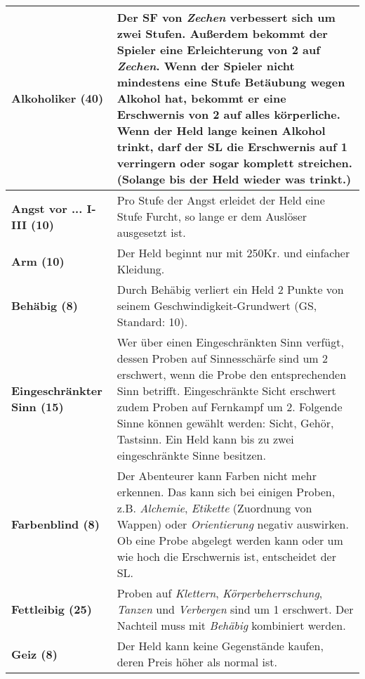 \begin{longtable}{|p{5cm}|p{11cm}|}
\hline

\textbf{Alkoholiker (40)} & Der SF von \textit{Zechen} verbessert sich um zwei Stufen. Außerdem bekommt der Spieler eine Erleichterung von 2 auf \textit{Zechen}. Wenn der Spieler nicht mindestens eine Stufe Betäubung wegen Alkohol hat, bekommt er eine Erschwernis von 2 auf alles körperliche. Wenn der Held lange keinen Alkohol trinkt, darf der SL die Erschwernis auf 1 verringern oder sogar komplett streichen. (Solange bis der Held wieder was trinkt.) \\ \hline

\textbf{Angst vor ... I-III (10)} & Pro Stufe der Angst erleidet der Held eine Stufe Furcht, so lange er dem Auslöser ausgesetzt ist. \\ \hline

\textbf{Arm (10)} & Der Held beginnt nur mit 250Kr. und einfacher Kleidung. \\ \hline

\textbf{Behäbig (8)} & Durch Behäbig verliert ein Held 2 Punkte von seinem Geschwindigkeit-Grundwert (GS, Standard: 10). \\ \hline

\textbf{Eingeschränkter Sinn (15)} & Wer über einen Eingeschränkten Sinn verfügt, dessen Proben auf Sinnesschärfe sind um 2 erschwert, wenn die Probe den entsprechenden Sinn betrifft. Eingeschränkte Sicht erschwert zudem Proben auf Fernkampf um 2. Folgende Sinne können gewählt werden: Sicht, Gehör, Tastsinn. Ein Held kann bis zu zwei eingeschränkte Sinne besitzen. \\ \hline

\textbf{Farbenblind (8)} & Der Abenteurer kann Farben nicht mehr erkennen. Das kann sich bei einigen Proben, z.B. \textit{Alchemie}, \textit{Etikette} (Zuordnung von Wappen) oder \textit{Orientierung} negativ auswirken. Ob eine Probe abgelegt werden kann oder um wie hoch die Erschwernis ist, entscheidet der SL. \\ \hline

\textbf{Fettleibig (25)} & Proben auf \textit{Klettern}, \textit{Körperbeherrschung}, \textit{Tanzen} und \textit{Verbergen} sind um 1 erschwert. Der Nachteil muss mit \textit{Behäbig} kombiniert werden. \\ \hline

\textbf{Geiz (8)} & Der Held kann keine Gegenstände kaufen, deren Preis höher als normal ist. \\ \hline


\end{longtable}
